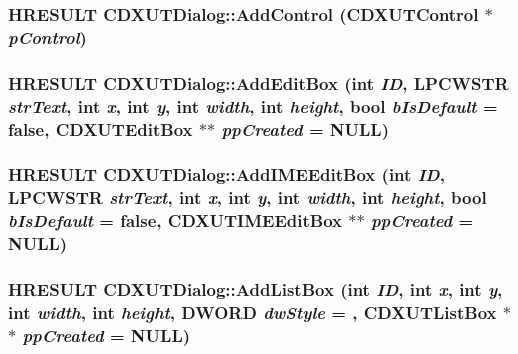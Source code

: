 \label{class_c_d_x_u_t_dialog_a5027ee1afa698e4273b44af289451d8e}
\hypertarget{class_c_d_x_u_t_dialog_a5a3ebb7853b588e398eb992b56274c35}{
\subsubsection[{AddControl}]{\setlength{\rightskip}{0pt plus 5cm}HRESULT CDXUTDialog::AddControl ({\bf CDXUTControl} $\ast$ {\em pControl})}}
\label{class_c_d_x_u_t_dialog_a5a3ebb7853b588e398eb992b56274c35}
\hypertarget{class_c_d_x_u_t_dialog_a1374799d1714dc22e7c54a0e76688dcf}{
\subsubsection[{AddEditBox}]{\setlength{\rightskip}{0pt plus 5cm}HRESULT CDXUTDialog::AddEditBox ({\bf int} {\em ID}, \/  LPCWSTR {\em strText}, \/  {\bf int} {\em x}, \/  {\bf int} {\em y}, \/  {\bf int} {\em width}, \/  {\bf int} {\em height}, \/  bool {\em bIsDefault} = {\ttfamily false}, \/  {\bf CDXUTEditBox} $\ast$$\ast$ {\em ppCreated} = {\ttfamily NULL})}}
\label{class_c_d_x_u_t_dialog_a1374799d1714dc22e7c54a0e76688dcf}
\hypertarget{class_c_d_x_u_t_dialog_a05c3acfebcc0b6f9ab88a9fb4e0979f5}{
\subsubsection[{AddIMEEditBox}]{\setlength{\rightskip}{0pt plus 5cm}HRESULT CDXUTDialog::AddIMEEditBox ({\bf int} {\em ID}, \/  LPCWSTR {\em strText}, \/  {\bf int} {\em x}, \/  {\bf int} {\em y}, \/  {\bf int} {\em width}, \/  {\bf int} {\em height}, \/  bool {\em bIsDefault} = {\ttfamily false}, \/  {\bf CDXUTIMEEditBox} $\ast$$\ast$ {\em ppCreated} = {\ttfamily NULL})}}
\label{class_c_d_x_u_t_dialog_a05c3acfebcc0b6f9ab88a9fb4e0979f5}
\hypertarget{class_c_d_x_u_t_dialog_a10004abccfeb7cad590614ff5b2cde65}{
\subsubsection[{AddListBox}]{\setlength{\rightskip}{0pt plus 5cm}HRESULT CDXUTDialog::AddListBox ({\bf int} {\em ID}, \/  {\bf int} {\em x}, \/  {\bf int} {\em y}, \/  {\bf int} {\em width}, \/  {\bf int} {\em height}, \/  DWORD {\em dwStyle} = {}, \/  {\bf CDXUTListBox} $\ast$$\ast$ {\em ppCreated} = {\ttfamily NULL})}}
